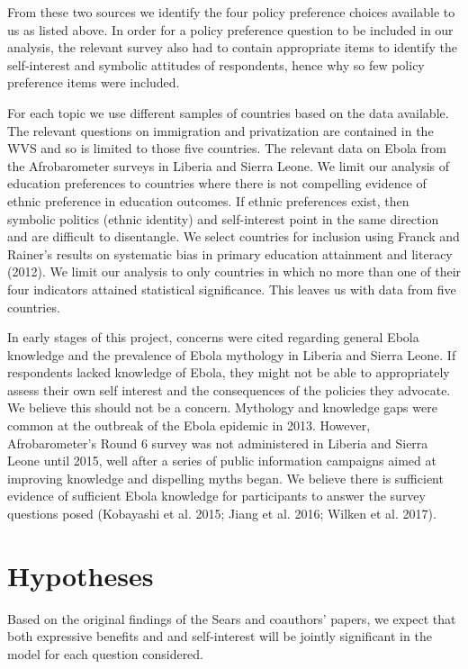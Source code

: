\documentclass[]{article}
\begin{document}
From these two sources we identify the four policy preference choices
available to us as listed above. In order for a policy preference
question to be included in our analysis, the relevant survey also had to
contain appropriate items to identify the self-interest and symbolic
attitudes of respondents, hence why so few policy preference items were
included.

For each topic we use different samples of countries based on the data
available. The relevant questions on immigration and privatization are
contained in the WVS and so is limited to those five countries. The
relevant data on Ebola from the Afrobarometer surveys in Liberia and
Sierra Leone. We limit our analysis of education preferences to
countries where there is not compelling evidence of ethnic preference in
education outcomes. If ethnic preferences exist, then symbolic politics
(ethnic identity) and self-interest point in the same direction and are
difficult to disentangle. We select countries for inclusion using Franck
and Rainer's results on systematic bias in primary education attainment
and literacy (2012). We limit our analysis to only countries in which no
more than one of their four indicators attained statistical
significance. This leaves us with data from five countries.

In early stages of this project, concerns were cited regarding general
Ebola knowledge and the prevalence of Ebola mythology in Liberia and
Sierra Leone. If respondents lacked knowledge of Ebola, they might not
be able to appropriately assess their own self interest and the
consequences of the policies they advocate. We believe this should not
be a concern. Mythology and knowledge gaps were common at the outbreak
of the Ebola epidemic in 2013. However, Afrobarometer's Round 6 survey
was not administered in Liberia and Sierra Leone until 2015, well after
a series of public information campaigns aimed at improving knowledge
and dispelling myths began. We believe there is sufficient evidence of
sufficient Ebola knowledge for participants to answer the survey
questions posed (Kobayashi et al. 2015; Jiang et al. 2016; Wilken et al.
2017).

\section{Hypotheses}\label{hypotheses}

Based on the original findings of the Sears and coauthors' papers, we
expect that both expressive benefits and and self-interest will be
jointly significant in the model for each question considered.
\end{document}
